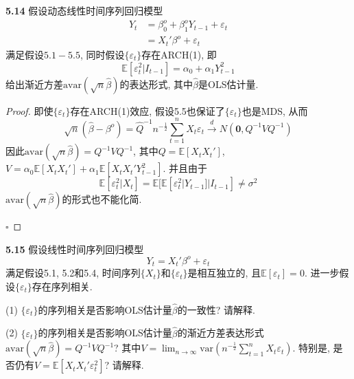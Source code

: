 \documentclass[cn,12pt,math=mtpro2,citestyle=gb7714-2015,bibstyle=gb7714-2015,twocol,mode=simple]{elegantbook}
\newcommand{\E}{\mathbb{E}}
\begin{document}
\textbf{5.14} 假设动态线性时间序列回归模型
\begin{align*}
Y_t&=\beta_0^o+\beta_1^oY_{t-1}+\varepsilon_t \\
&=X_t'\beta^o+\varepsilon_t
\end{align*}
满足假设$5.1-5.5$, 同时假设$\{\varepsilon_t\}$存在ARCH(1), 即
$$\E[\varepsilon_t^2|I_{t-1}]=\alpha_0+\alpha_1Y_{t-1}^2$$
给出渐近方差$\text{avar}(\sqrt{n}\hat{\beta})$的表达形式, 其中$\hat{\beta}$是OLS估计量.

\begin{proof}
即使$\{\varepsilon_t\}$存在ARCH(1)效应, 假设5.5也保证了$\{\varepsilon_t\}$也是MDS, 从而
$$\sqrt{n}(\hat{\beta}-\beta^o)=\hat{Q}^{-1}n^{-\frac{1}{2}}\sum_{t=1}^{n}X_t\varepsilon_t\xrightarrow{d} N(\mathbf{0},Q^{-1}VQ^{-1})$$
因此$\text{avar}(\sqrt{n}\hat{\beta})=Q^{-1}VQ^{-1}$, 其中$Q=\E[X_tX_t']$, $V=\alpha_0\E[X_tX_t']+\alpha_1\E[X_tX_t'Y_{t-1}^2]$. 并且由于
$$\E[\varepsilon_t^2|X_t]=\E[\E[\varepsilon_t^2|Y_{t-1}]|I_{t-1}]\neq\sigma^2$$
$\text{avar}(\sqrt{n}\hat{\beta})$的形式也不能化简.

$\square$
\end{proof}

\textbf{5.15} 假设线性时间序列回归模型
$$Y_t=X_t'\beta^o+\varepsilon_t$$
满足假设5.1, 5.2和5.4, 时间序列$\{X_t\}$和$\{\varepsilon_t\}$是相互独立的, 且$\E[\varepsilon_t]=0$. 进一步假设$\{\varepsilon_t\}$存在序列相关.

(1) $\{\varepsilon_t\}$的序列相关是否影响OLS估计量$\hat{\beta}$的一致性? 请解释.

(2) $\{\varepsilon_t\}$的序列相关是否影响OLS估计量$\hat{\beta}$的渐近方差表达形式$\text{avar}(\sqrt{n}\hat{\beta})=Q^{-1}VQ^{-1}$? 其中$V=\displaystyle\lim_{n\to\infty}\text{var}\left(n^{-\frac{1}{2}}\sum_{t=1}^{n}X_t\varepsilon_t\right)$. 特别是, 是否仍有$V=\E[X_tX_t'\varepsilon_t^2]$? 请解释.
\end{document}
